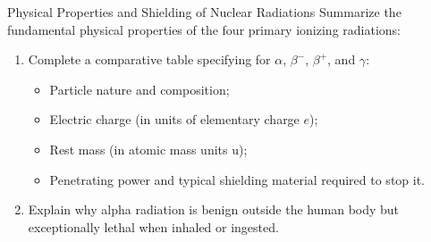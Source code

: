 \vspace{10pt}

\begin{exercise}{Physical Properties and Shielding of Nuclear Radiations}
Summarize the fundamental physical properties of the four primary ionizing radiations:
\begin{enumerate}[leftmargin=1.5em,itemsep=2pt]
  \item Complete a comparative table specifying for $\alpha$, $\beta^-$, $\beta^+$, and $\gamma$:
  \begin{itemize}[itemsep=1pt]
    \item Particle nature and composition;
    \item Electric charge (in units of elementary charge $e$);
    \item Rest mass (in atomic mass units $\mathrm{u}$);
    \item Penetrating power and typical shielding material required to stop it.
  \end{itemize}
  \item Explain why alpha radiation is benign outside the human body but exceptionally lethal when inhaled or ingested.
\end{enumerate}
\end{exercise}

\begin{tabletworkspace}[5.0cm]
\end{tabletworkspace}

